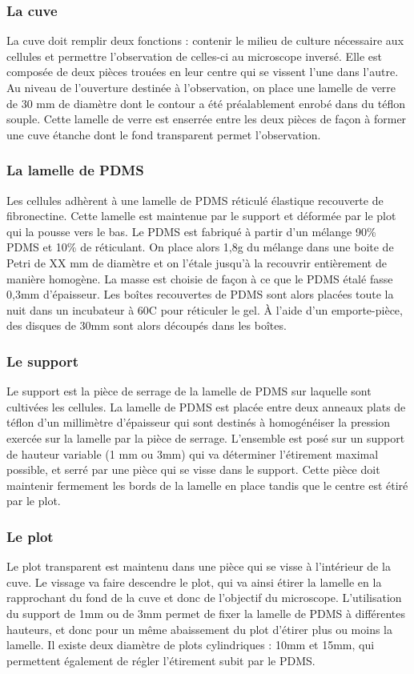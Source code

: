 \documentclass{report}
\begin{document}
	\subsubsection{La cuve}
	La cuve doit remplir deux fonctions : contenir le milieu de culture nécessaire aux cellules et permettre l'observation de celles-ci au microscope inversé. Elle est composée de deux pièces trouées en leur centre qui se vissent l'une dans l'autre. Au niveau de l'ouverture destinée à l'observation, on place une lamelle de verre de 30 mm de diamètre dont le contour a été préalablement enrobé dans du téflon souple. Cette lamelle de verre est enserrée entre les deux pièces de façon à former une cuve étanche dont le fond transparent permet l'observation.
	\subsubsection{La lamelle de PDMS} 
	Les cellules adhèrent à une lamelle de PDMS réticulé élastique recouverte de fibronectine. Cette lamelle est maintenue par le support et déformée par le plot qui la pousse vers le bas. 
	Le PDMS est fabriqué à partir d'un mélange 90\% PDMS et 10\% de réticulant. On place alors 1,8g du mélange dans une boite de Petri de XX mm de diamètre et on l'étale jusqu'à la recouvrir entièrement de manière homogène. La masse est choisie de façon à ce que le PDMS étalé fasse 0,3mm d'épaisseur. Les boîtes recouvertes de PDMS sont alors placées toute la nuit dans un incubateur à 60\degres  C pour réticuler le gel. À l'aide d'un emporte-pièce, des disques de 30mm sont alors découpés dans les boîtes.

		
	\subsubsection{Le support}
	Le support est la pièce de serrage de la lamelle de PDMS sur laquelle sont cultivées les cellules. La lamelle de PDMS est placée entre deux anneaux plats de téflon d'un millimètre d'épaisseur qui sont destinés à homogénéiser la pression exercée sur la lamelle par la pièce de serrage. L'ensemble est posé sur un support de hauteur variable (1 mm ou 3mm) qui va déterminer l'étirement maximal possible, et serré par une pièce qui se visse dans le support. 
	Cette pièce doit maintenir fermement les bords de la lamelle en place tandis que le centre est étiré par le plot. 
	\subsubsection{Le plot}
	Le plot transparent est maintenu dans une pièce qui se visse à l'intérieur de la cuve. Le vissage va faire descendre le plot, qui va ainsi étirer la lamelle en la rapprochant du fond de la cuve et donc de l'objectif du microscope. 
	L'utilisation du support de 1mm ou de 3mm permet de fixer la lamelle de PDMS à différentes hauteurs, et donc pour un même abaissement du plot d'étirer plus ou moins la lamelle. Il existe deux diamètre de plots cylindriques : 10mm et 15mm, qui permettent également de régler l'étirement subit par le PDMS. 
\end{document}
